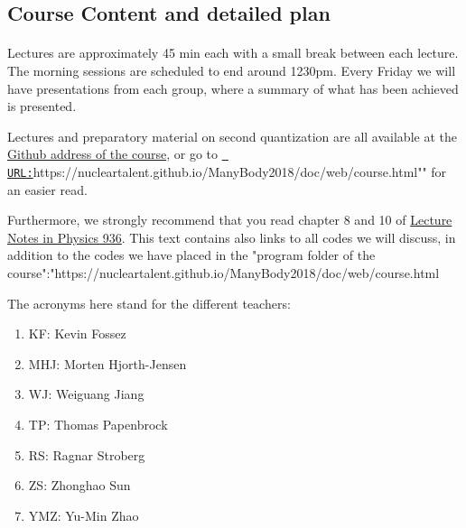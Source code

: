 \documentclass[%
oneside,                 %
final,                   %
10pt]{article}
\begin{document}
\noindent





\subsection{Course Content and detailed plan}

\paragraph{}

Lectures are approximately 45 min each with a small break between each lecture. The morning sessions are scheduled to end around 1230pm. 
Every Friday we will have presentations from each group, where a summary of what has been achieved is presented. 

Lectures and preparatory material on second quantization are all available at the \href{{https://github.com/NuclearTalent/ManyBody2018}}{Github address of the course}, or go to \href{{URL:}}{\nolinkurl{ URL:}}https://nucleartalent.github.io/ManyBody2018/doc/web/course.html""  for an easier read. 

Furthermore, we strongly recommend that you read chapter 8 and 10 of \href{{https://www.springer.com/us/book/9783319533353}}{Lecture Notes in Physics 936}. This text contains also links to all codes we will discuss, in addition to the codes we have placed in the "program folder of the course":"https://nucleartalent.github.io/ManyBody2018/doc/web/course.html

The acronyms here stand for the different teachers:
\begin{enumerate}
\item KF: Kevin Fossez

\item MHJ: Morten Hjorth-Jensen

\item WJ: Weiguang Jiang

\item TP: Thomas Papenbrock

\item RS: Ragnar Stroberg

\item ZS: Zhonghao Sun

\item YMZ: Yu-Min Zhao
\end{enumerate}
\end{document}
